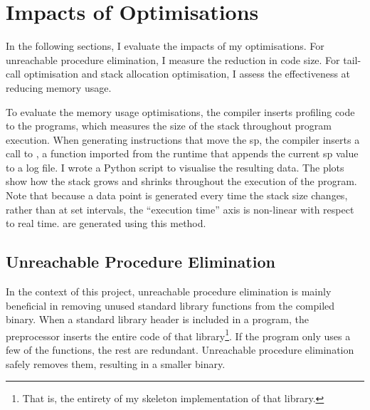 \documentclass[00-main.tex]{subfiles}
\begin{document}
\section{Impacts of Optimisations}\label{sec:eval:optimisations}

In the following sections, I evaluate the impacts of my optimisations.
For unreachable procedure elimination, I measure the reduction in code size.
For tail-call optimisation and stack allocation optimisation, I assess the effectiveness at reducing memory usage.

To evaluate the memory usage optimisations, the compiler inserts profiling code to the programs, which measures the size of the stack throughout program execution.
When generating instructions that move the \acrlong{sp}, the compiler inserts a call to , a function imported from the runtime that appends the current \acrlong{sp} value to a log file.
I wrote a Python script to visualise the resulting data.
The plots show how the stack grows and shrinks throughout the execution of the program.
Note that because a data point is generated every time the stack size changes, rather than at set intervals, the ``execution time'' axis is non-linear with respect to real time.
 are generated using this method.

\subsection{Unreachable Procedure Elimination}\label{sec:eval:unreachable procedure elimination}

In the context of this project, unreachable procedure elimination is mainly beneficial in removing unused standard library functions from the compiled binary.
When a standard library header is included in a program, the preprocessor inserts the entire code of that library\footnote{That is, the entirety of my skeleton implementation of that library.}.
If the program only uses a few of the functions, the rest are redundant.
Unreachable procedure elimination safely removes them, resulting in a smaller binary.

\end{document}
